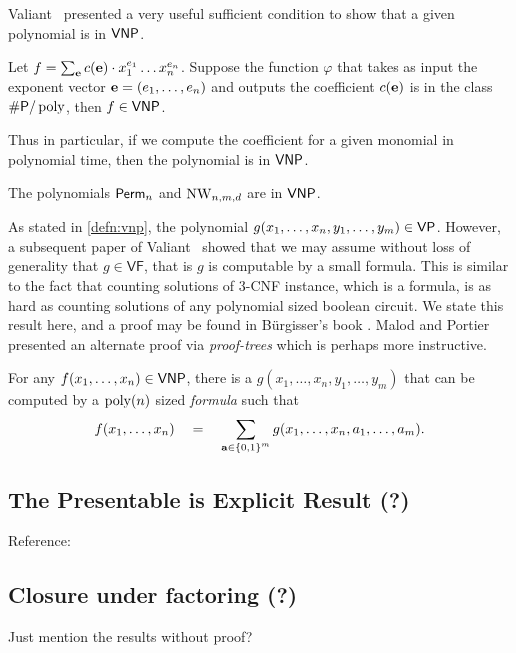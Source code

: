 Valiant~\cite{v79} presented a very useful sufficient condition to show that a given polynomial is in $\mathsf{VNP}$. 

\begin{theorem} \label{thm:val-criterion}
Let $f = \sum_{\mathbf{e}} c(\mathbf{e}) \cdot x_1^{e_1}\dots x_n^{e_n}$. 
Suppose the function $\varphi$ that takes as input the exponent vector $\mathbf{e} = (e_1,\dots, e_n)$ and outputs the coefficient $c(\mathbf{e})$ is in the class $\#\mathsf{P}/\operatorname{poly}$, then $f \in \mathsf{VNP}$. 
\end{theorem}

Thus in particular, if we compute the coefficient for a given monomial in polynomial time, then the polynomial is in $\mathsf{VNP}$. 

\begin{corollary}
The polynomials $\operatorname{\mathsf{Perm}}_n$ and $\operatorname{\mathrm{NW}}_{n,m,d}$ are in $\mathsf{VNP}$. 
\end{corollary}

As stated in \autoref{defn:vnp}, the polynomial $g(x_1,\dots, x_n, y_1,\dots, y_m) \in \mathsf{VP}$. 
However, a subsequent paper of Valiant~\cite{v82} showed that we may assume without loss of generality that $g \in \mathsf{VF}$, that is $g$ is computable by a small formula. 
This is similar to the fact that counting solutions of 3-\textsf{CNF} instance, which is a formula, is as hard as counting solutions of any polynomial sized boolean circuit. 
We state this result here, and a proof may be found in B\"urgisser's book \cite{bur00}. Malod and Portier \cite{MP08} presented an alternate proof via \emph{proof-trees} which is perhaps more instructive. 

\begin{theorem}\label{thm:vnp-formula}
For any $f(x_1,\dots, x_n)\in \mathsf{VNP}$, there is a $g(x_1,\dots, x_n, y_1,\dots, y_m)$ that can be computed by a $\operatorname{poly}(n)$ sized \emph{formula} such that 
\[
f(x_1,\dots, x_n)\quad = \quad \sum_{\mathbf{a} \in \left\{0,1\right\}^m} g(x_1,\dots, x_n, a_1,\dots, a_m).
\]
\end{theorem}

\subsection{The Presentable is Explicit Result (?)}

Reference: \cite{BDS24}

\subsection{Closure under factoring (?)}

Just mention the results without proof? 


